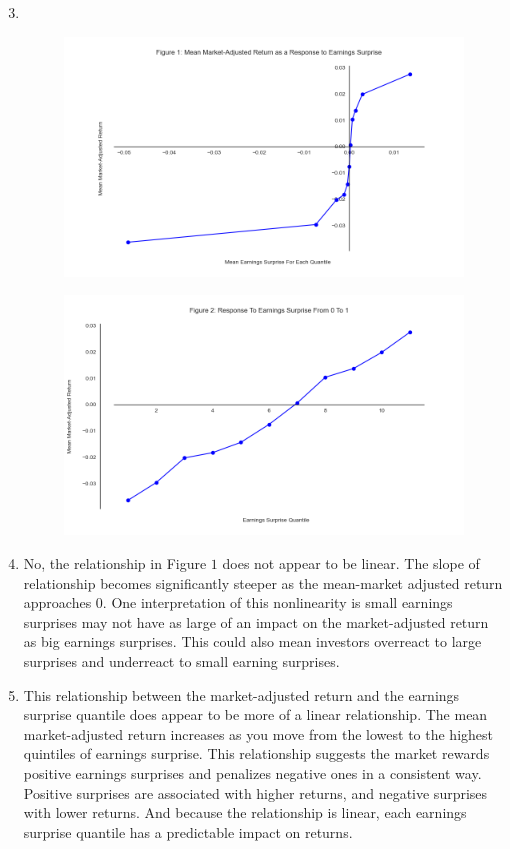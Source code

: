 \documentclass[11pt]{article}
\begin{document}
\begin{enumerate}
\setcounter{enumi}{2}
\renewcommand{\labelenumi}{(\theenumi)}
    \item \, \\
    
    \begin{figure}[H] 
        \centering
        \includegraphics[width=.8\textwidth]{fig1.png}
    \end{figure}

    \begin{figure}[H] 
        \centering
        \includegraphics[width=.8\textwidth]{fig2.png}
    \end{figure}
    
    \item No, the relationship in Figure $1$ does not appear to be linear. The slope of relationship becomes significantly 
    steeper as the mean-market adjusted return approaches $0$. One interpretation of this nonlinearity is small earnings 
    surprises may not have as large of an impact on the market-adjusted return as big earnings surprises. This could 
    also mean investors overreact to large surprises and underreact to small earning surprises.
    
    \item This relationship between the market-adjusted return and the earnings surprise quantile does appear to be more 
    of a linear relationship. The mean market-adjusted return increases as you move from the lowest to the highest 
    quintiles of earnings surprise. This relationship suggests the market rewards positive earnings surprises and 
    penalizes negative ones in a consistent way. Positive surprises are associated with higher returns, and negative 
    surprises with lower returns. And because the relationship is linear, each earnings surprise quantile has a 
    predictable impact on returns.

\end{enumerate}
\end{document}
